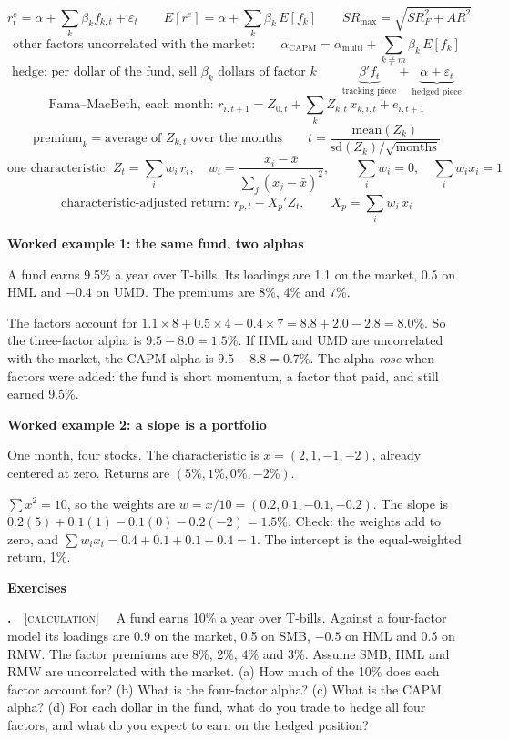 \documentclass[11pt]{article}
\newcounter{ex}[section]
\renewcommand{\theex}{\thesection.\arabic{ex}}
\newenvironment{ex}[1][calculation]{\refstepcounter{ex}\par\medskip\textbf{\theex}\ \ {\small\textsc{[#1]}}\ \ }{\par}
\newcommand{\head}[1]{\par\medskip\textbf{#1}\par}
\newcommand{\re}{r^{e}}
\newcommand{\SR}{\mathit{SR}}
\newcommand{\AR}{\mathit{AR}}
\begin{document}
\begin{keybox}
\[ \re_{t} = \alpha + \sum_{k}\beta_{k} f_{k,t} + \varepsilon_{t}
   \qquad E[\re] = \alpha + \sum_{k}\beta_{k}\,E[f_{k}]
   \qquad \SR_{\max} = \sqrt{\SR_{F}^{2} + \AR^{2}} \]
\[ \text{other factors uncorrelated with the market:}\qquad
   \alpha_{\text{CAPM}} = \alpha_{\text{multi}} + \sum_{k \neq m}\beta_{k}\,E[f_{k}] \]
\[ \text{hedge: per dollar of the fund, sell } \beta_{k} \text{ dollars of factor } k
   \qquad \underbrace{\beta' f_{t}}_{\text{tracking piece}} + \underbrace{\alpha + \varepsilon_{t}}_{\text{hedged piece}} \]
\[ \text{Fama--MacBeth, each month: } r_{i,t+1} = Z_{0,t} + \sum_{k} Z_{k,t}\,x_{k,i,t} + e_{i,t+1} \]
\[ \text{premium}_{k} = \text{average of } Z_{k,t} \text{ over the months}
   \qquad t = \frac{\text{mean}(Z_{k})}{\text{sd}(Z_{k})/\sqrt{\text{months}}} \]
\[ \text{one characteristic: } Z_{t} = \sum_{i} w_{i}\,r_{i}, \quad
   w_{i} = \frac{x_{i} - \bar x}{\sum_{j}(x_{j} - \bar x)^{2}}, \qquad \sum_{i} w_{i} = 0, \quad \sum_{i} w_{i}x_{i} = 1 \]
\[ \text{characteristic-adjusted return: } r_{p,t} - X_{p}'Z_{t}, \qquad X_{p} = \sum_{i} w_{i}\,x_{i} \]
\end{keybox}

\head{Worked example 1: the same fund, two alphas}
A fund earns 9.5\% a year over T-bills. Its loadings are 1.1 on the market, 0.5 on HML and $-0.4$ on UMD. The premiums
are 8\%, 4\% and 7\%.

The factors account for $1.1\times 8 + 0.5\times 4 - 0.4\times 7 = 8.8 + 2.0 - 2.8 = 8.0\%$. So the three-factor alpha is
$9.5 - 8.0 = 1.5\%$. If HML and UMD are uncorrelated with the market, the CAPM alpha is $9.5 - 8.8 = 0.7\%$. The alpha
\emph{rose} when factors were added: the fund is short momentum, a factor that paid, and still earned 9.5\%.

\head{Worked example 2: a slope is a portfolio}
One month, four stocks. The characteristic is $x = (2, 1, -1, -2)$, already centered at zero. Returns are
$(5\%, 1\%, 0\%, -2\%)$.

$\sum x^{2} = 10$, so the weights are $w = x/10 = (0.2, 0.1, -0.1, -0.2)$. The slope is
$0.2(5) + 0.1(1) - 0.1(0) - 0.2(-2) = 1.5\%$. Check: the weights add to zero, and
$\sum w_{i}x_{i} = 0.4 + 0.1 + 0.1 + 0.4 = 1$. The intercept is the equal-weighted return, 1\%.

\head{Exercises}

\begin{ex}\label{ex:5.1}
A fund earns 10\% a year over T-bills. Against a four-factor model its loadings are 0.9 on the market, 0.5 on SMB,
$-0.5$ on HML and 0.5 on RMW. The factor premiums are 8\%, 2\%, 4\% and 3\%. Assume SMB, HML and RMW are uncorrelated
with the market. (a) How much of the 10\% does each factor account for? (b) What is the four-factor alpha? (c) What
is the CAPM alpha? (d) For each dollar in the fund, what do you trade to hedge all four factors, and what do you expect
to earn on the hedged position?
\end{ex}
\end{document}
